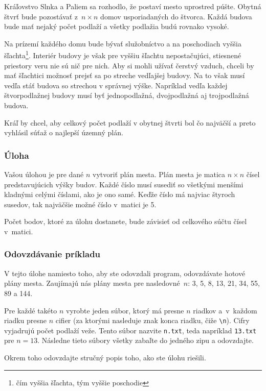 Kráľovstvo Slnka a Paliem sa rozhodlo, že postaví mesto uprostred púšte.
Obytná štvrť bude pozostávať z~$n\times n$ domov usporiadaných do
štvorca. Každá budova bude mať nejaký počet podlaží a všetky podlažia
budú rovnako vysoké.

Na prízemí každého domu bude bývať služobníctvo a na poschodiach vyššia
šľachta\footnote{čím vyššia šľachta, tým vyššie poschodie}. Interiér
budovy je však pre vyššiu šľachtu nepostačujúci, stiesnené priestory
veru nie sú nič pre nich. Aby si mohli užívať čerstvý vzduch, chceli by
mať šľachtici možnosť prejsť sa po streche vedľajšej budovy. Na to však
musí vedľa stáť budova so strechou v správnej výške. Napríklad vedľa
každej štvorpodlažnej budovy musí byť jednopodlažná, dvojpodlažná aj
trojpodlažná budova.

Kráľ by chcel, aby celkový počet podlaží v obytnej štvrti bol čo
najväčší a preto vyhlásil súťaž o najlepší územný plán.

\subsubsection{Úloha}

Vašou úlohou je pre dané $n$ vytvoriť plán mesta. Plán mesta je matica
$n\times n$ čísel predstavujúcich výšky budov. Každé číslo musí susediť
so všetkými menšími kladnými celými číslami, ako je ono samé. Keďže
číslo má najviac štyroch susedov, tak najväčšie možné číslo v~matici je
5.

Počet bodov, ktoré za úlohu dostanete, bude závisieť od celkového súčtu
čísel v~matici.

\subsubsection{Odovzdávanie príkladu}

V tejto úlohe namiesto toho, aby ste odovzdali program, odovzdávate hotové plány mesta.
Zaujímajú nás plány mesta pre nasledovné~$n$: 3, 5, 8, 13, 21, 34, 55, 89 a 144.

Pre každé takéto $n$ vyrobte jeden súbor, ktorý má presne $n$ riadkov a~v~každom
riadku presne $n$ cifier (za ktorými nasleduje znak konca
riadku, čiže \verb|\n|). Cifry vyjadrujú počet podlaží
veže. Tento súbor nazvite \texttt{n.txt}, teda napríklad \texttt{13.txt}
pre $n=13$. Následne tieto súbory všetky zabaľte do jedného zipu a
odovzdajte.

Okrem toho odovzdajte stručný popis toho, ako ste úlohu riešili.

